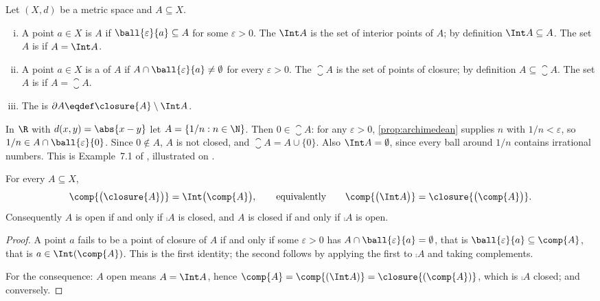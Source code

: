 \begin{definition}\label{def:interior-closure}
	Let $(X,d)$ be a metric space and $A\subseteq X$.
	\begin{enumerate}[(i)]
		\item A point $a\in X$ is  $A$ if
		      $\ball{\varepsilon}{a}\subseteq A$ for some $\varepsilon>0$. The
		       $\Int A$ is the set of interior points of $A$; by
		      definition $\Int A\subseteq A$. The set $A$ is  if
		      $A=\Int A$.
		\item A point $a\in X$ is a  of $A$
		      if $A\cap\ball{\varepsilon}{a}\neq\emptyset$ for every $\varepsilon>0$.
		      The  $\closure{A}$ is the set of points of closure; by
		      definition $A\subseteq\closure{A}$. The set $A$ is  if $A=\closure{A}$.
		\item The  is $\partial A\eqdef\closure{A}\setminus\Int A$.
	\end{enumerate}
\end{definition}

\begin{eg}
	\label{eg:closure-1overn}
	In $\R$ with $d(x,y)=\abs{x-y}$ let $A=\{1/n : n\in\N\}$. Then $0\in\closure A$:
	for any $\varepsilon>0$, \autoref{prop:archimedean} supplies $n$ with
	$1/n<\varepsilon$, so $1/n\in A\cap\ball{\varepsilon}{0}$. Since $0\notin A$,
	$A$ is not closed, and $\closure A=A\cup\{0\}$. Also $\Int A=\emptyset$, since
	every ball around $1/n$ contains irrational numbers. This is Example~7.1 of
	\textcite{fukuda2026notes}, illustrated on
	\autocite[slide 33]{fukuda2026analysis}.
\end{eg}

\begin{proposition}\label{prop:interior-closure-duality}
	For every $A\subseteq X$,
	\[
		\comp{\bigl(\closure{A}\bigr)}=\Int\bigl(\comp{A}\bigr),
		\qquad\text{equivalently}\qquad
		\comp{\bigl(\Int A\bigr)}=\closure{\bigl(\comp{A}\bigr)} .
	\]
	Consequently $A$ is open if and only if $\comp{A}$ is closed, and $A$ is closed
	if and only if $\comp{A}$ is open.
\end{proposition}

\begin{proof}
	A point $a$ fails to be a point of closure of $A$ if and only if some
	$\varepsilon>0$ has $A\cap\ball{\varepsilon}{a}=\emptyset$, that is
	$\ball{\varepsilon}{a}\subseteq\comp{A}$, that is $a\in\Int(\comp{A})$. This is
	the first identity; the second follows by applying the first to $\comp{A}$ and
	taking complements.

	For the consequence: $A$ open means $A=\Int A$, hence
	$\comp{A}=\comp{(\Int A)}=\closure{(\comp{A})}$, which is $\comp A$ closed; and
	conversely.
\end{proof}

